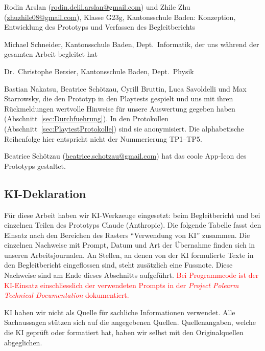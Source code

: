 \documentclass[../Main.tex]{subfiles}
\begin{document}
\begin{description}[leftmargin=1.5cm, style=nextline, itemsep=0.6em]
    \item[Projektteam] Rodin Arslan (\url{rodin.delil.arslan@gmail.com}) und Zhile Zhu (\url{zhuzhile08@gmail.com}), Klasse G23g, Kantonsschule Baden: Konzeption, Entwicklung des Prototyps und Verfassen des Begleitberichts
    \item[Erstbetreuung] Michael Schneider, Kantonsschule Baden, Dept.\ Informatik, der uns während der gesamten Arbeit begleitet hat
    \item[Zweitbewerter] Dr.\ Christophe Bersier, Kantonsschule Baden, Dept.\ Physik
    \item[Testpersonen] Bastian Nakatsu, Beatrice Schötzau, Cyrill Bruttin, Luca Savoldelli und Max Starrowsky, die den Prototyp in den Playtests gespielt und uns mit ihren Rückmeldungen wertvolle Hinweise für unsere Auswertung gegeben haben (Abschnitt~\ref{sec:Durchfuehrung}). In den Protokollen (Abschnitt~\ref{sec:PlaytestProtokolle}) sind sie anonymisiert. Die alphabetische Reihenfolge hier entspricht nicht der Nummerierung TP1--TP5.
    \item[Weitere Unterstützung] Beatrice Schötzau (\url{beatrice.schotzau@gmail.com}) hat das coole App-Icon des Prototyps gestaltet.
\end{description}

\subsection{KI-Deklaration} \label{sec:KIDeklaration}

Für diese Arbeit haben wir KI-Werkzeuge eingesetzt: beim Begleitbericht und bei einzelnen Teilen des Prototyps Claude (Anthropic). Die folgende Tabelle fasst den Einsatz nach den Bereichen des Rasters \enquote{Verwendung von KI} zusammen. Die einzelnen Nachweise mit Prompt, Datum und Art der Übernahme finden sich in unseren Arbeitsjournalen. An Stellen, an denen von der KI formulierte Texte in den Begleitbericht eingeflossen sind, steht zusätzlich eine Fussnote. Diese Nachweise sind am Ende dieses Abschnitts aufgeführt. \textcolor{red}{Bei Programmcode ist der KI-Einsatz einschliesslich der verwendeten Prompts in der \textit{Project Polearm Technical Documentation} dokumentiert.}

KI haben wir nicht als Quelle für sachliche Informationen verwendet. Alle Sachaussagen stützen sich auf die angegebenen Quellen. Quellenangaben, welche die KI geprüft oder formatiert hat, haben wir selbst mit den Originalquellen abgeglichen.
\end{document}
